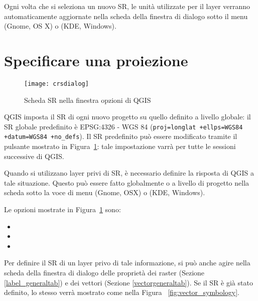 Ogni volta che si seleziona un nuovo SR, le unità utilizzate per il layer verranno automaticamente aggiornate 
nella scheda  della finestra di dialogo  
sotto il menu  (Gnome, OS X) o  (KDE, Windows).

\section{Specificare una proiezione}
\label{sec:projection-specifying}

\begin{figure}[ht]
   \centering
   \texttt{[image: crsdialog]}
   \caption{Scheda SR nella finestra opzioni di QGIS \nixcaption}\label{fig:crsdialog}
\end{figure}

QGIS imposta il SR di ogni nuovo progetto su quello definito a livello globale: il SR globale predefinito è 
EPSG:4326 - WGS 84 (\texttt{proj=longlat +ellps=WGS84 +datum=WGS84 +no\_defs}). Il SR predefinito può essere 
modificato tramite il pulsante  mostrato in Figura~\ref{fig:crsdialog}: tale impostazione 
varrà per tutte le sessioni successive di QGIS.

Quando si utilizzano layer privi di SR, è necessario definire la risposta di QGIS a tale situazione.
Questo può essere fatto globalmente o a livello di progetto nella scheda  
sotto la voce di menu  \arrow {} (Gnome, OSX) o
 \arrow {}(KDE, Windows).

Le opzioni mostrate in Figura~\ref{fig:crsdialog} sono:
\begin{itemize}[label=--]
\item {}
\item {}
\item {}
\end{itemize}

Per definire il SR di un layer privo di tale informazione, si può anche agire nella scheda 
della finestra di dialogo delle proprietà dei raster (Sezione \ref{label_generaltab}) e dei vettori (Sezione \ref{vectorgeneraltab}). 
Se il SR è già stato definito, lo stesso verrà mostrato come nella Figura ~\ref{fig:vector_symbology}.


